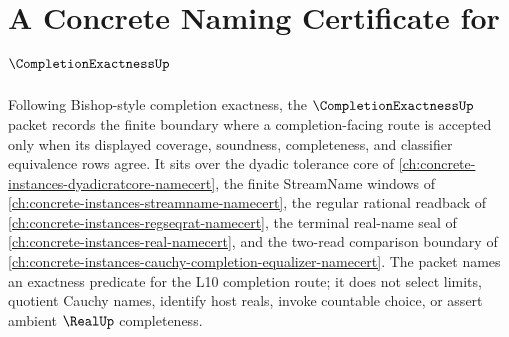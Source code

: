 \chapter{A Concrete Naming Certificate for $\CompletionExactnessUp$}
\label{ch:concrete-instances-completion-exactness-namecert}

Following Bishop-style completion exactness, the $\CompletionExactnessUp$ packet records the finite boundary where a completion-facing route is accepted only when its displayed coverage, soundness, completeness, and classifier equivalence rows agree. It sits over the dyadic tolerance core of \autoref{ch:concrete-instances-dyadicratcore-namecert}, the finite StreamName windows of \autoref{ch:concrete-instances-streamname-namecert}, the regular rational readback of \autoref{ch:concrete-instances-regseqrat-namecert}, the terminal real-name seal of \autoref{ch:concrete-instances-real-namecert}, and the two-read comparison boundary of \autoref{ch:concrete-instances-cauchy-completion-equalizer-namecert}. The packet names an exactness predicate for the L10 completion route; it does not select limits, quotient Cauchy names, identify host reals, invoke countable choice, or assert ambient $\RealUp$ completeness.

